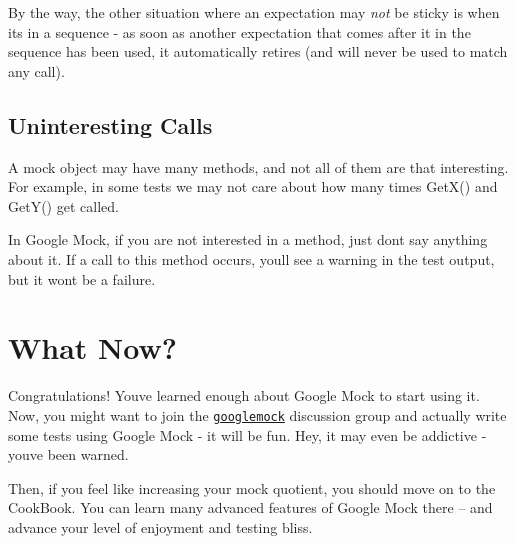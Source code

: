 By the way, the other situation where an expectation may {\itshape not} be sticky is when it\textquotesingle{}s in a sequence -\/ as soon as another expectation that comes after it in the sequence has been used, it automatically retires (and will never be used to match any call).

\subsection*{Uninteresting Calls}

A mock object may have many methods, and not all of them are that interesting. For example, in some tests we may not care about how many times {\ttfamily Get\+X()} and {\ttfamily Get\+Y()} get called.

In Google Mock, if you are not interested in a method, just don\textquotesingle{}t say anything about it. If a call to this method occurs, you\textquotesingle{}ll see a warning in the test output, but it won\textquotesingle{}t be a failure.

\section*{What Now?}

Congratulations! You\textquotesingle{}ve learned enough about Google Mock to start using it. Now, you might want to join the \href{http://groups.google.com/group/googlemock}{\tt googlemock} discussion group and actually write some tests using Google Mock -\/ it will be fun. Hey, it may even be addictive -\/ you\textquotesingle{}ve been warned.

Then, if you feel like increasing your mock quotient, you should move on to the Cook\+Book. You can learn many advanced features of Google Mock there -- and advance your level of enjoyment and testing bliss. 